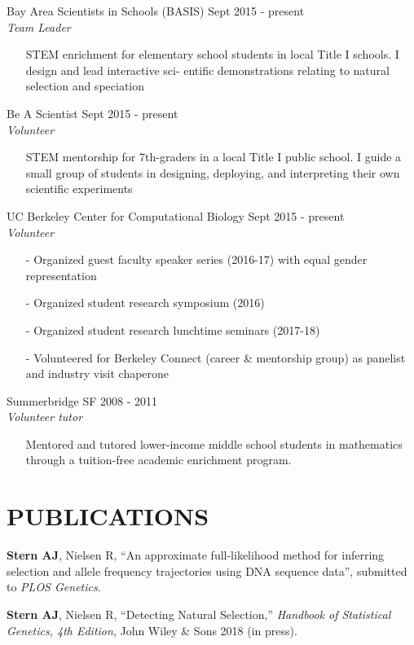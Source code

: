 \documentclass[margin, 10pt]{res} %
\begin{document}
\begin{resume}
Bay Area Scientists in Schools (BASIS) \hfill Sept 2015 - present\\
{\sl Team Leader}
\begin{itemize}
\item[] STEM enrichment for elementary school students in local Title I schools. I design and lead interactive sci- entific demonstrations relating to natural selection and speciation
\end{itemize} 
Be A Scientist \hfill Sept 2015 - present\\
{\sl Volunteer}
\begin{itemize}
\item[] STEM mentorship for 7th-graders in a local Title I public school. I guide a small group of students in designing, deploying, and interpreting their own scientific experiments
\end{itemize} 
UC Berkeley Center for Computational Biology \hfill Sept 2015 - present\\
{\sl Volunteer}
\begin{itemize}
\item[-] Organized guest faculty speaker series (2016-17) with equal gender representation
\item[-] Organized student research symposium (2016)
\item[-] Organized student research lunchtime seminars (2017-18)
\item[-] Volunteered for Berkeley Connect (career \& mentorship group) as panelist and industry visit chaperone
\end{itemize}
Summerbridge SF \hfill 2008 - 2011\\
{\sl Volunteer tutor}
\begin{itemize}
\item[] Mentored and tutored lower-income middle school students in mathematics through a tuition-free academic enrichment program.
\end{itemize}

\section{PUBLICATIONS}

{\bf Stern AJ}, Nielsen R, ``An approximate full-likelihood method for inferring selection and allele frequency trajectories using DNA sequence data'', submitted to {\it PLOS Genetics}. 

{\bf Stern AJ}, Nielsen R, ``Detecting Natural Selection,'' {\it Handbook of Statistical Genetics, 4th Edition},  John Wiley \& Sons 2018 (in press).


\end{resume}
\end{document}
